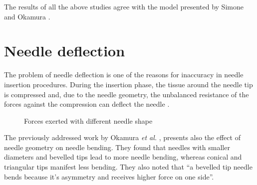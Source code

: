 The results of all the above studies agree with the model presented by Simone and Okamura \cite{Okamura2004}.

\section{Needle deflection}
The problem of needle deflection is one of the reasons for inaccuracy in needle insertion procedures. During the insertion phase, the tissue around the needle tip is compressed and, due to the needle geometry, the unbalanced resistance of the forces against the compression can deflect the needle \cite{katakoa2001}.
	\begin{figure}
	\centering
	\hspace{0.5cm}
		\caption[Forces exerted with different needle shape]{Forces exerted with different needle shape \cite{katakoa2001}}
\end{figure}
The previously addressed work by Okamura \textit{et al.} \cite{Okamura2004}, presents also the effect of needle geometry on needle bending.
They found that needles with smaller diameters and bevelled tips lead to more needle bending, whereas conical and triangular tips manifest less bending. They also noted that “a bevelled tip needle bends because it's asymmetry and receives higher force on one side”.
